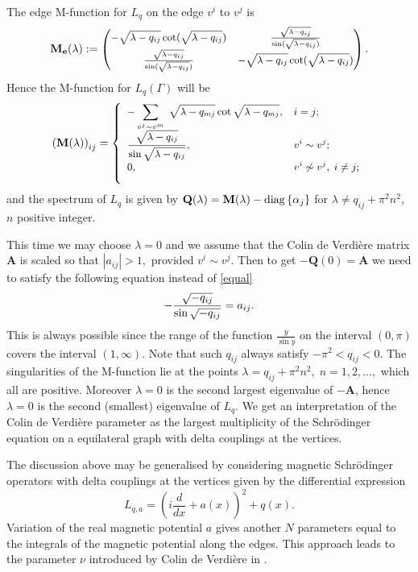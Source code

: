 \documentclass{amsart}
\theoremstyle{definition}
\theoremstyle{remark}
\numberwithin{equation}{section}
\begin{document}
{The edge M-function for $ L_q$ on the edge $v^i$ to $v^j$ is 
$$ \small \mathbf M_{\bf e} (\lambda) : = \begin{pmatrix} -\sqrt{\lambda-q_{ij} }\cot(\sqrt{\lambda-q_{ij} }) & \frac{\sqrt{\lambda-q_{ij} }}{\sin(\sqrt{\lambda-q_{ij} })} \\ \frac{\sqrt{\lambda-q_{ij} }}{\sin(\sqrt{\lambda-q_{ij} })} & -\sqrt{\lambda-q_{ij} }\cot(\sqrt{\lambda-q_{ij} })\end{pmatrix}.$$
Hence the M-function for $ L_q (\Gamma) $ will be
\begin{equation}
\small \left(\mathbf M (\lambda) \right)_{ij} =
\left\{
\begin{array}{ll}
- \displaystyle \sum_{v^j \sim v^m}  \; \sqrt{\lambda-q_{mj}} \cot \sqrt{\lambda-q_{mj}}, & i =j; \\[3mm]
 \displaystyle \frac{\sqrt{\lambda-q_{ij}}}{\sin \sqrt{\lambda-q_{ij}}} , & v^i \sim v^j; \\[3mm]
\displaystyle  0, &  v^i \not\sim v^j, \; i \neq j; \\[3mm]
 \end{array} \right.
\end{equation}
and the spectrum of  $L_q$ is given by $\mathbf Q(\lambda)=\mathbf M(\lambda) - {\rm diag}\, \{ \alpha_j \}$ for $\lambda\neq q_{ij}+\pi^2n^2$, $n$ positive integer.

This time we may choose $ \lambda = 0 $ and we assume that the Colin de Verdi\`ere matrix $ \mathbf A $ is scaled so that $ | a_{ij} | > 1,$ provided $ v^i \sim v^j. $
Then to get $ -\mathbf Q(0) = \mathbf A $ we need to satisfy the following equation  instead of \eqref{equal}
$$ \small - \frac{\sqrt{-q_{ij}}}{\sin \sqrt{-q_{ij}}}=a_{ij}. $$
This is always possible since the range of the function $ \frac{y}{\sin y} $ on the interval $ (0,\pi) $ covers the interval $ (1, \infty). $
Note that such $ q_{ij} $ always satisfy
$ - \pi^2 < q_{ij} < 0 . $
The singularities of the M-function lie at the points $ \lambda = q_{ij} + \pi^2 n^2, \; n =1,2, \dots ,$ which all are positive. Moreover $ \lambda = 0 $ is the second largest eigenvalue of $
- \mathbf A $, hence $ \lambda = 0 $ is the second (smallest) eigenvalue of $ L_q $.  We get an interpretation of the Colin de Verdi\`ere parameter as the largest multiplicity of the Schr\"odinger 
equation on a equilateral graph with delta couplings at the vertices.

The discussion above may be generalised by considering magnetic Schr\"odinger operators with delta couplings at the vertices given by
the differential expression
$$L_{q,a} =\left(i\frac{d}{dx}+a(x)\right)^2+q(x).$$ 
Variation of the real magnetic potential $ a$ gives another $ N $ parameters equal to the integrals of the magnetic potential along the edges.
This approach leads to the parameter $\nu$ introduced by Colin de Verdi\`ere  in \cite{YC98}.

}
\end{document}
